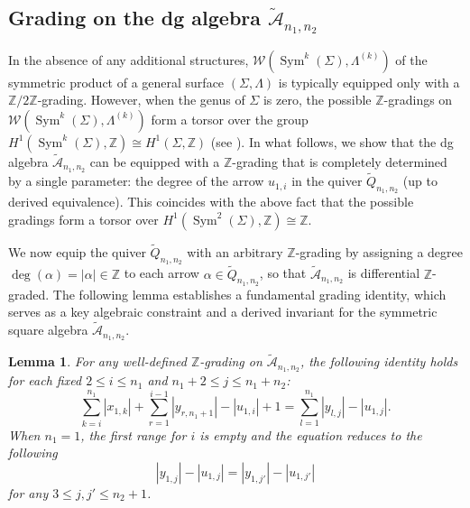 \documentclass[a4paper, reqno, 11pt]{amsart}
\newtheorem{lemma}[theorem]{Lemma}
\theoremstyle{definition}
\begin{document}
\subsection{Grading on the dg algebra $\widetilde{\mathcal{A}}_{n_1,n_2}$}
\label{subsec:grading}
In the absence of any additional structures, $\mathcal{W}(\operatorname{Sym}^k(\Sigma), \Lambda^{(k)})$ of the symmetric product of a general surface $(\Sigma, \Lambda)$ is typically equipped only with a $\mathbb{Z}/2\mathbb{Z}$-grading. However, when the genus of $\Sigma$ is zero, the possible $\mathbb{Z}$-gradings on $\mathcal{W}(\operatorname{Sym}^k(\Sigma), \Lambda^{(k)})$ form a torsor over the group $H^1(\operatorname{Sym}^k(\Sigma), \mathbb{Z}) \cong H^1(\Sigma, \mathbb{Z})$ (see \cite{Seidel2000, Dyckerhoff-Jasso-Lekili2021}). In what follows, we show that the dg algebra $\widetilde{\mathcal{A}}_{n_1, n_2}$ can be equipped with a $\mathbb{Z}$-grading that  is completely determined by a single parameter: the degree of the arrow $u_{1,i}$ in the quiver $\widetilde{Q}_{n_1, n_2}$ (up to derived equivalence). This coincides with the above fact that the possible gradings form a torsor over $H^1(\operatorname{Sym}^2(\Sigma), \mathbb{Z}) \cong \mathbb{Z}$. 

We now equip the quiver $\widetilde{Q}_{n_1, n_2}$ with an arbitrary $\mathbb{Z}$-grading by assigning a degree $\deg(\alpha) = |\alpha| \in \mathbb{Z}$ to each arrow $\alpha \in \widetilde{Q}_{n_1, n_2}$, so that $\widetilde{\mathcal A}_{n_1,n_2}$ is differential $\mathbb Z$-graded. The following lemma establishes a fundamental grading identity,  which serves as a key algebraic constraint and a derived invariant for the symmetric square algebra $\widetilde{\mathcal{A}}_{n_1, n_2}$.

\begin{lemma}\label{der invariant} 
	For any well-defined $\mathbb{Z}$-grading on $\widetilde{\mathcal A}_{n_1,n_2}$, the following identity holds for each fixed $2 \leq i \leq n_1$ and $n_1+2 \leq j \leq n_1+n_2$: 
	\[ \sum\limits_{k=i}^{n_1} |x_{1,k}| + \sum\limits_{r=1}^{i-1} |y_{r,n_1+1}| -|u_{1,i}|+1 = \sum\limits_{l=1}^{n_1} |y_{l,j}| - |u_{1,j}|. \] 
	When \(n_1=1\), the first range for $i$ is empty and the equation reduces to the following  $$|y_{1,j}|-|u_{1,j}| = |y_{1,j'}|-|u_{1,j'}|$$ for any $3\leq j, j'\leq n_2+1$.
\end{lemma}
\end{document}
